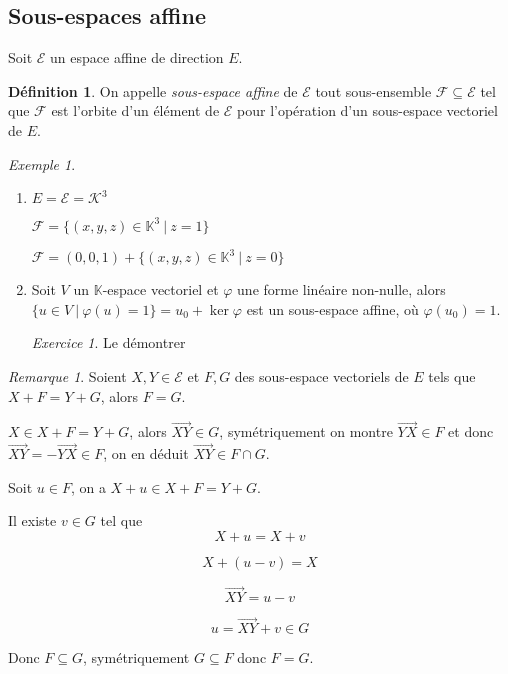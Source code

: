 \documentclass[]{article}
\theoremstyle{remark}
\newtheorem{myrem}{Remarque}
\newtheorem{myexer}{Exercice}
\newtheorem{myexmpl}{Exemple}
\theoremstyle{definition}
\newtheorem{mydef}{Définition}
\begin{document}
\subsection{Sous-espaces affine}

Soit $\mathcal{E}$ un espace affine de direction $E$.

\begin{mydef}
	On appelle \textit{sous-espace affine} de $\mathcal{E}$ tout sous-ensemble $\mathcal{F} \subseteq \mathcal{E}$ tel que $\mathcal{F}$ est l'orbite d'un élément de $\mathcal{E}$ pour l'opération d'un sous-espace vectoriel de $E$.
\end{mydef}

\begin{myexmpl}
	\leavevmode
	\begin{enumerate}
		\item
		$E=\mathcal{E} = \mathcal{K}^3$
		
		$\mathcal{F} = \{ (x, y, z) \in \mathbb{K}^3 ~ | ~ z = 1 \}$
		
		$\mathcal{F} = (0, 0, 1) + \{(x, y, z) \in \mathbb{K}^3 ~ | ~ z = 0\}$
		
		\item
		Soit $V$ un $\mathbb{K}$-espace vectoriel et $\varphi$ une forme linéaire non-nulle, alors $\{u \in V ~ | ~ \varphi(u) = 1\} = u_0 + \ker \varphi$ est un sous-espace affine, où $\varphi(u_0)=1$.
		
		\begin{myexer}
			Le démontrer
			\label{exo11}
		\end{myexer}
	\end{enumerate}
\end{myexmpl}

\begin{myrem}
	Soient $X, Y \in \mathcal{E}$ et $F, G$ des sous-espace vectoriels de $E$ tels que $X + F = Y + G$, alors $F = G$.
	
	$X \in X + F = Y + G$, alors $\overrightarrow{XY} \in G$, symétriquement on montre $\overrightarrow{YX} \in F$ et donc $\overrightarrow{XY} = -\overrightarrow{YX} \in F$, on en déduit $\overrightarrow{XY} \in F \cap G$.
	
	Soit $u \in F$, on a $X + u \in X + F = Y + G$.

	Il existe $v \in G$ tel que
	$$X + u = X + v$$

	$$X + (u-v) = X$$

	$$\overrightarrow{XY} = u - v$$

	$$u = \overrightarrow{XY} + v \in G$$
	
	Donc $F \subseteq G$, symétriquement $G \subseteq F$ donc $F = G$.
\end{myrem}
\end{document}
